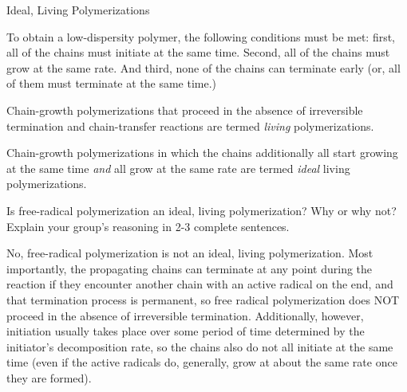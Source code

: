 \begin{activity}{Ideal, Living Polymerizations}
\begin{ctqs}
		\begin{solution}[2in]{}
			To obtain a low-dispersity polymer, the following conditions must be met: first, all of the chains must initiate at the same time.  Second, all of the chains must grow at the same rate.  And third, none of the chains can terminate early (or, all of them must terminate at the same time.)
		\end{solution}

\end{ctqs}

\begin{infobox}

	Chain-growth polymerizations that proceed in the absence of irreversible termination and chain-transfer reactions are termed \emph{living} polymerizations.
	
	Chain-growth polymerizations in which the chains additionally all start growing at the same time \emph{and} all grow at the same rate are termed \emph{ideal} living polymerizations.

\end{infobox}

\begin{ctqs}

	\question Is free-radical polymerization an ideal, living polymerization?  Why or why not?  Explain your group's reasoning in 2-3 complete sentences.
	
		\begin{solution}[2in]{}
			No, free-radical polymerization is not an ideal, living polymerization.  Most importantly, the propagating chains can terminate at any point during the reaction if they encounter another chain with an active radical on the end, and that termination process is permanent, so free radical polymerization does NOT proceed in the absence of irreversible termination.  Additionally, however, initiation usually takes place over some period of time determined by the initiator's decomposition rate, so the chains also do not all initiate at the same time (even if the active radicals do, generally, grow at about the same rate once they are formed).
		\end{solution}

\end{ctqs}

\begin{model}
	\label{\labelbase:mdl:poisson}


\end{model}
\end{activity}
